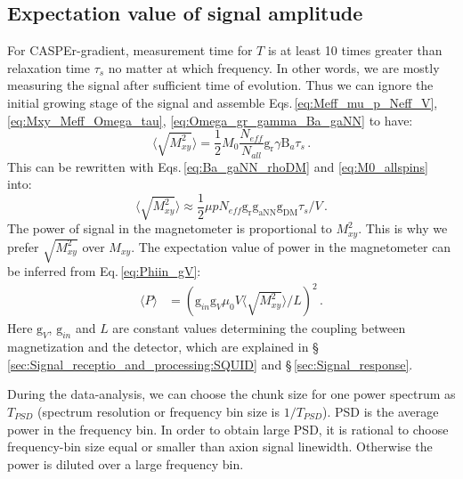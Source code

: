 \subsection{Expectation value of signal amplitude}\label{sec:axion_signal_estimation:Expectation_value}
For CASPEr-gradient, measurement time for $T$ is at least 10 times greater than relaxation time $\tau_s$ no matter at which frequency. In other words, we are mostly measuring the signal after sufficient time of evolution. Thus we can ignore the initial growing stage of the signal and assemble Eqs.\,\eqref{eq:Meff_mu_p_Neff_V}, \eqref{eq:Mxy_Meff_Omega_tau}, \eqref{eq:Omega_gr_gamma_Ba_gaNN} to have:
\begin{equation}
    \langle \sqrt{M_{xy}^2} \rangle = \dfrac{1}{2} M_0 \dfrac{N_{eff}}{N_{all}} \mathrm{g_{r}} \gamma \mathrm{B}_{a}  \tau_s 
    \,.\label{eq:Mxy_Meff_gr_gamma_Ba_taus}
\end{equation}
This can be rewritten with Eqs.\,\eqref{eq:Ba_gaNN_rhoDM} and \eqref{eq:M0_allspins} into:
\begin{equation}
    \langle \sqrt{M_{xy}^2} \rangle \approx \dfrac{1}{2} \mu p N_{eff} \mathrm{g_{r}} \mathrm{g_{aNN}} \mathrm{g_{DM}} \tau_s / V \,.
\end{equation}
The power of signal in the magnetometer is proportional to $M_{xy}^2$. This is why we prefer $\sqrt{M_{xy}^2}$ over $M_{xy}$. 
The expectation value of power in the magnetometer can be inferred from Eq.\,\eqref{eq:Phiin_gV}:
\begin{align}
    \langle P \rangle &= (\mathrm{g}_{in} \mathrm{g}_{V} \mu_0 V \langle \sqrt{M_{xy}^2} \rangle/ L )^2\,.
\end{align}
Here $\mathrm{g}_{V}$, $\mathrm{g}_{in}$ and $L$ are constant values determining the coupling between magnetization and the detector, which are explained in \S\,\ref{sec:Signal_receptio_and_processing:SQUID} and \S\,\ref{sec:Signal_response}. 

During the data-analysis, we can choose the chunk size for one power spectrum as $T_{PSD}$ (spectrum resolution or frequency bin size is $1/T_{PSD}$). PSD is the average power in the frequency bin. 
In order to obtain large PSD, it is rational to choose frequency-bin size equal or smaller than axion signal linewidth. Otherwise the power is diluted over a large frequency bin. 


